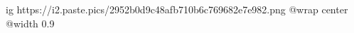  
 
 
 
 

\ifcmt
  ig https://i2.paste.pics/2952b0d9c48afb710b6c769682e7e982.png
  @wrap center
  @width 0.9
\fi
